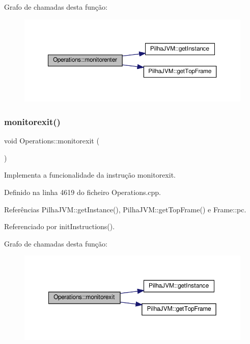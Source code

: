 Grafo de chamadas desta função\+:\nopagebreak
\begin{figure}[H]
\begin{center}
\leavevmode
\includegraphics[width=350pt]{classOperations_a4d62d66d9e60667ed4e689cd6a44ecaa_cgraph}
\end{center}
\end{figure}
\mbox{\label{classOperations_af3fc8364ad200be676ea35e4b918e8e6}} 
\subsubsection{\texorpdfstring{monitorexit()}{monitorexit()}}
{\footnotesize\ttfamily void Operations\+::monitorexit (\begin{DoxyParamCaption}{ }\end{DoxyParamCaption})\hspace{0.3cm}{\ttfamily [private]}}



Implementa a funcionalidade da instrução monitorexit. 



Definido na linha 4619 do ficheiro Operations.\+cpp.



Referências Pilha\+J\+V\+M\+::get\+Instance(), Pilha\+J\+V\+M\+::get\+Top\+Frame() e Frame\+::pc.



Referenciado por init\+Instructions().

Grafo de chamadas desta função\+:\nopagebreak
\begin{figure}[H]
\begin{center}
\leavevmode
\includegraphics[width=350pt]{classOperations_af3fc8364ad200be676ea35e4b918e8e6_cgraph}
\end{center}
\end{figure}
\mbox{\label{classOperations_a78c45edfcdf63668974ffc3b2d84a309}} 
